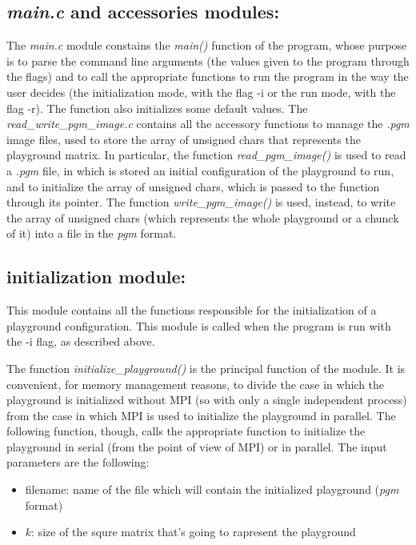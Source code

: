 \documentclass[12pt, titlepage]{report}
\begin{document}
\subsection{\emph{main.c} and accessories modules:}
The \emph{main.c} module constains the \emph{main()} function of the program, whose purpose is to parse the command line arguments (the values given to 
the program through the flags) and to call the appropriate functions to run the program in the way the user decides (the initialization mode, with the flag -i 
or the run mode, with the flag -r). The function also initializes some default values. The \emph{read\_write\_pgm\_image.c} contains all the accessory functions
to manage the \emph{.pgm} image files, used to store the array of unsigned chars that represents the playground matrix. In particular, the function
\emph{read\_pgm\_image()} is used to read a \emph{.pgm} file, in which is stored an initial configuration of the playground to run, and to initialize
the array of unsigned chars, which is passed to the function through its pointer. The function \emph{write\_pgm\_image()} is used, instead, to write the array 
of unsigned chars (which represents the whole playground or a chunck of it) into a file in the \emph{pgm} format.

\subsection{initialization module:}
This module contains all the functions responsible for the initialization of a playground configuration. This module is called when the program is run with 
the -i flag, as described above.

The function \emph{initialize\_playground()} is the principal function of the module. It is convenient, for memory management reasons, to divide 
the case in which the playground is initialized without MPI (so with only a single independent process) from the case in which MPI is used to initialize the 
playground in parallel. The following function, though, calls the appropriate function to initialize the playground in serial (from the point of view
of MPI) or in parallel. The input parameters are the following:
\begin{itemize}
	\item filename: name of the file which will contain the initialized playground (\emph{pgm} format)
	\item $k$: size of the squre matrix that's going to rapresent the playground
\end{itemize}
\end{document}
